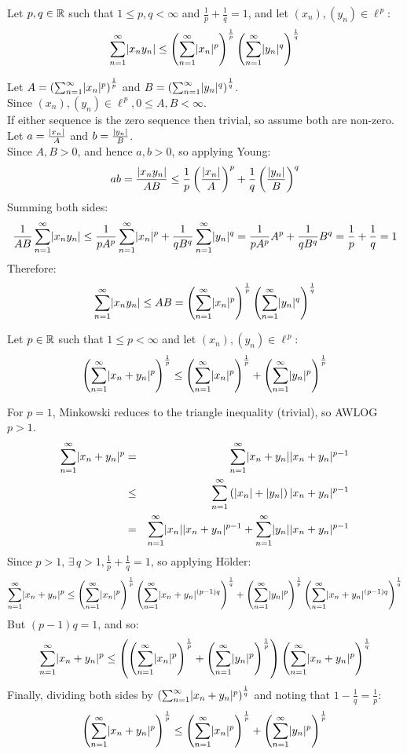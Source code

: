 \documentclass[letterpaper,12pt,fleqn]{article}
\newcommand{\lp}{\ell^{\,p}}
\newcommand{\normp}[2]{\sum_{n=1}^{\infty}\abs{#1}^{#2}}
\newcommand{\norm}[2]{\left(\normp{#1}{#2}\right)^{\frac{1}{#2}}}
\begin{document}
\begin{theorem}
  Let $p,q\in\mathbb{R}$ such that $1\le p,q<\infty$ and $\frac{1}{p}+\frac{1}{q}=1$,
  and let $(x_n),(y_n)\in\lp$:
  \[\sum_{n=1}^{\infty}\abs{x_ny_n}\le\norm{x_n}{p}\norm{y_n}{q}\]
\end{theorem}

\begin{theproof}
  Let $A=\norm{x_n}{p}$ and $B=\norm{y_n}{q}$. \\
  Since $(x_n),(y_n)\in\lp, 0\le A,B<\infty$. \\
  If either sequence is the zero sequence then trivial, so assume both are
  non-zero. \\
  Let $a=\frac{\lvert x_n\rvert}{A}$ and $b=\frac{\lvert y_n\rvert}{B}$. \\
  Since $A,B>0$, and hence $a,b>0$, so applying Young:
  \[ab=\frac{\lvert x_ny_n\rvert}{AB}\le
  \frac{1}{p}\left(\frac{\lvert x_n\rvert}{A}\right)^p +
  \frac{1}{q}\left(\frac{\lvert y_n\rvert}{B}\right)^q\]
  Summing both sides:
  \[\frac{1}{AB}\sum_{n=1}^{\infty}\lvert x_ny_n\rvert\le
  \frac{1}{pA^p}\sum_{n=1}^{\infty}\lvert x_n\rvert^p+
  \frac{1}{qB^q}\sum_{n=1}^{\infty}\lvert y_n\rvert^q=
  \frac{1}{pA^p}A^p+\frac{1}{qB^q}B^q=\frac{1}{p}+\frac{1}{q}=1\]
  Therefore:
  \[\sum_{n=1}^{\infty}\abs{x_ny_n}\le AB=\norm{x_n}{p}\norm{y_n}{q}\]
\end{theproof}

\begin{theorem}
  Let $p\in\mathbb{R}$ such that $1\le p<\infty$ and let $(x_n),(y_n)\in\lp$:
  \[\norm{x_n+y_n}{p}\le\norm{x_n}{p}+\norm{y_n}{p}\]
\end{theorem}

\newpage

\begin{theproof}
  For $p=1$, Minkowski reduces to the triangle inequality (trivial), so AWLOG
  $p>1$. \\
  \begin{eqnarray*}
    \normp{x_n+y_n}{p} &=& \sum_{n=1}^{\infty}\abs{x_n+y_n}\abs{x_n+y_n}^{p-1} \\
    &\le& \sum_{n=1}^{\infty}
    \left(\abs{x_n}+\abs{y_n}\right)\abs{x_n+y_n}^{p-1} \\
    &=& \sum_{n=1}^{\infty}\abs{x_n}\abs{x_n+y_n}^{p-1}+
    \sum_{n=1}^{\infty}\abs{y_n}\abs{x_n+y_n}^{p-1} \\
  \end{eqnarray*}
  Since $p>1$, $\exists\,q>1,\frac{1}{p}+\frac{1}{q}=1$, so applying H\"{o}lder:
  \[\normp{x_n+y_n}{p}\le
  \norm{x_n}{p}
  \left(\sum_{n=1}^{\infty}\abs{x_n+y_n}^{(p-1)q}\right)^{\frac{1}{q}}+
  \norm{y_n}{p}
  \left(\sum_{n=1}^{\infty}\abs{x_n+y_n}^{(p-1)q}\right)^{\frac{1}{q}}\]
  But $(p-1)q=1$, and so:
  \[\normp{x_n+y_n}{p}\le\left(\norm{x_n}{p}+\norm{y_n}{p}\right)
  \left(\sum_{n=1}^{\infty}\abs{x_n+y_n}^p\right)^{\frac{1}{q}}\]
  Finally, dividing both sides by
  $\left(\sum_{n=1}^{\infty}\lvert x_n+y_n\rvert^p\right)^{\frac{1}{q}}$ and noting that
  $1-\frac{1}{q}=\frac{1}{p}$:
  \[\norm{x_n+y_n}{p}\le\norm{x_n}{p}+\norm{y_n}{p}\]
\end{theproof}
\end{document}
